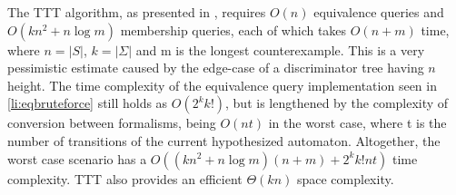 The TTT algorithm, as presented in \cite{10.1007/978-3-319-11164-3_26}, requires $O(n)$ equivalence queries and $O(kn^2+n\log m)$ membership queries, each of which takes $O(n+m)$ time, where $n=|S|$, $k=|\Sigma|$ and m is the longest counterexample. This is a very pessimistic estimate caused by the edge-case of a discriminator tree having $n$ height. The time complexity of the equivalence query implementation seen in \ref{li:eqbruteforce} still holds as $O(2^kk!)$, but is lengthened by the complexity of conversion between formalisms, being $O(nt)$ in the worst case, where t is the number of transitions of the current hypothesized automaton. Altogether, the worst case scenario has a $O((kn^2+n\log m)(n+m) + 2^kk!nt)$ time complexity. TTT also provides an efficient $\Theta(kn)$ space complexity\cite{10.1007/978-3-319-11164-3_26}.
